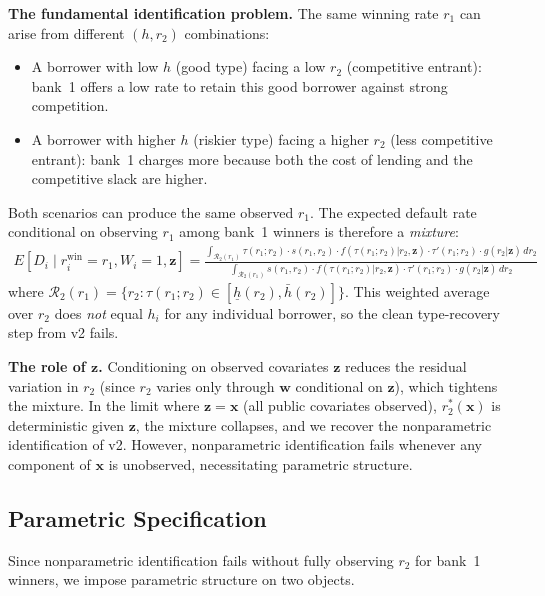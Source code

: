 \documentclass[12pt]{article}
\theoremstyle{plain}
\theoremstyle{plain}
\theoremstyle{definition}  %
\theoremstyle{remark}  %
\begin{document}
\medskip\noindent
\textbf{The fundamental identification problem.} The same winning rate $r_1$ can arise from different $(h, r_2)$ combinations:
\begin{itemize}
    \item A borrower with low $h$ (good type) facing a low $r_2$ (competitive entrant): bank~1 offers a low rate to retain this good borrower against strong competition.
    \item A borrower with higher $h$ (riskier type) facing a higher $r_2$ (less competitive entrant): bank~1 charges more because both the cost of lending and the competitive slack are higher.
\end{itemize}
Both scenarios can produce the same observed $r_1$. The expected default rate conditional on observing $r_1$ among bank~1 winners is therefore a \emph{mixture}:
\begin{align}\label{eq:mixture}
    E[D_i \mid r_i^{\text{win}} = r_1, W_i = 1, \mathbf{z}] = \frac{\int_{\mathcal{R}_2(r_1)} \tau(r_1; r_2) \cdot s(r_1, r_2) \cdot f(\tau(r_1;r_2)|r_2, \mathbf{z}) \cdot \tau'(r_1;r_2) \cdot g(r_2|\mathbf{z})\, dr_2}{\int_{\mathcal{R}_2(r_1)} s(r_1, r_2) \cdot f(\tau(r_1;r_2)|r_2, \mathbf{z}) \cdot \tau'(r_1;r_2) \cdot g(r_2|\mathbf{z})\, dr_2}
\end{align}
where $\mathcal{R}_2(r_1) = \{r_2: \tau(r_1; r_2) \in [\underline{h}(r_2), \bar{h}(r_2)]\}$. This weighted average over $r_2$ does \emph{not} equal $h_i$ for any individual borrower, so the clean type-recovery step from v2 fails.

\medskip\noindent
\textbf{The role of $\mathbf{z}$.} Conditioning on observed covariates $\mathbf{z}$ reduces the residual variation in $r_2$ (since $r_2$ varies only through $\mathbf{w}$ conditional on $\mathbf{z}$), which tightens the mixture. In the limit where $\mathbf{z} = \mathbf{x}$ (all public covariates observed), $r_2^*(\mathbf{x})$ is deterministic given $\mathbf{z}$, the mixture collapses, and we recover the nonparametric identification of v2. However, nonparametric identification fails whenever any component of $\mathbf{x}$ is unobserved, necessitating parametric structure.

\subsection{Parametric Specification}\label{sec:parametric}

Since nonparametric identification fails without fully observing $r_2$ for bank~1 winners, we impose parametric structure on two objects.
\end{document}
